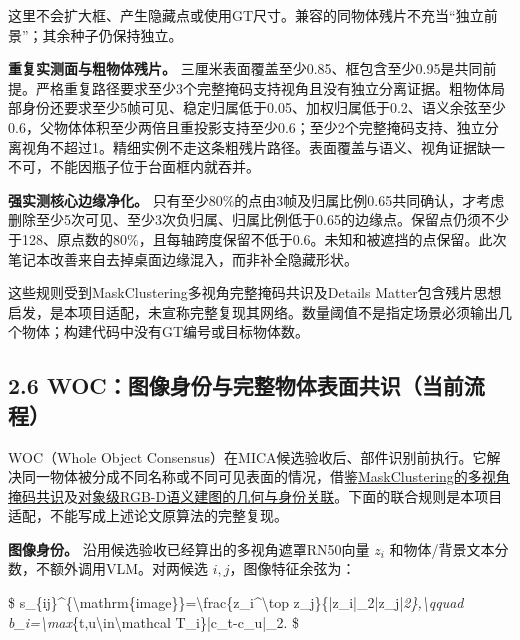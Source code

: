 \documentclass[UTF8,fontset=fandol]{ctexart}
\begin{document}
这里不会扩大框、产生隐藏点或使用GT尺寸。兼容的同物体残片不充当“独立前景”；其余种子仍保持独立。



\textbf{重复实测面与粗物体残片。} 三厘米表面覆盖至少0.85、框包含至少0.95是共同前提。严格重复路径要求至少3个完整掩码支持视角且没有独立分离证据。粗物体局部身份还要求至少5帧可见、稳定归属低于0.05、加权归属低于0.2、语义余弦至少0.6，父物体体积至少两倍且重投影支持至少0.6；至少2个完整掩码支持、独立分离视角不超过1。精细实例不走这条粗残片路径。表面覆盖与语义、视角证据缺一不可，不能因瓶子位于台面框内就吞并。



\textbf{强实测核心边缘净化。} 只有至少80\%的点由3帧及归属比例0.65共同确认，才考虑删除至少5次可见、至少3次负归属、归属比例低于0.65的边缘点。保留点仍须不少于128、原点数的80\%，且每轴跨度保留不低于0.6。未知和被遮挡的点保留。此次笔记本改善来自去掉桌面边缘混入，而非补全隐藏形状。



这些规则受到MaskClustering多视角完整掩码共识及Details Matter包含残片思想启发，是本项目适配，未宣称完整复现其网络。数量阈值不是指定场景必须输出几个物体；构建代码中没有GT编号或目标物体数。



\subsection*{2.6 WOC：图像身份与完整物体表面共识（当前流程）}

WOC（Whole Object Consensus）在MICA候选验收后、部件识别前执行。它解决同一物体被分成不同名称或不同可见表面的情况，借鉴\href{https://github.com/PKU-EPIC/MaskClustering}{MaskClustering的多视角掩码共识}及\href{https://arxiv.org/abs/1903.00268}{对象级RGB-D语义建图的几何与身份关联}。下面的联合规则是本项目适配，不能写成上述论文原算法的完整复现。



\textbf{图像身份。} 沿用候选验收已经算出的多视角遮罩RN50向量 $z_i$ 和物体/背景文本分数，不额外调用VLM。对两候选 $i,j$，图像特征余弦为：



\$
s\_\{ij\}\textasciicircum{}\{\textbackslash{}mathrm\{image\}\}=\textbackslash{}frac\{z\_i\textasciicircum{}\textbackslash{}top z\_j\}\{|z\_i|\_2|z\_j|\emph{2\},\textbackslash{}qquad
b\_i=\textbackslash{}max}\{t,u\textbackslash{}in\textbackslash{}mathcal T\_i\}|c\_t-c\_u|\_2.
\$
\end{document}
